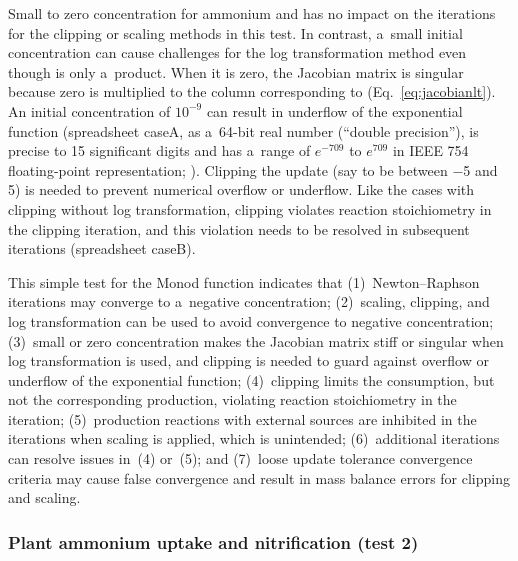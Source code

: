\documentclass[gmd,noline]{copernicus}
\begin{document}
      Small to zero concentration for ammonium and  has no
      impact on the iterations for the clipping or scaling methods in this
      test. In contrast, a~small initial  concentration can
      cause challenges for the log transformation method even though
       is only a~product. When it is zero, the Jacobian matrix
      is singular because zero is multiplied to the column corresponding to
       (Eq.~\ref{eq:jacobianlt}). An initial 
      concentration of $10^{-9}$ can result in underflow of the exponential
      function (spreadsheet caseA, as a~64-bit real number (``double
      precision''), is precise to 15 significant digits and has a~range of
      $e^{-709}$ to $e^{709}$ in IEEE 754 floating-point representation;
      \citealp{Lemmon2005}).  Clipping the update (say to be between $-$5 and
      5) is needed to prevent numerical overflow or underflow. Like the
      cases with clipping without log transformation, clipping violates
      reaction stoichiometry in the clipping iteration, and this violation
      needs to be resolved in subsequent iterations (spreadsheet caseB).

      This simple test for the Monod function indicates that
      (1)~Newton--Raphson iterations may converge to a~negative
      concentration; (2)~scaling, clipping, and log transformation can be
      used to avoid convergence to negative concentration; (3)~small or zero
      concentration makes the Jacobian matrix stiff or singular when log
      transformation is used, and clipping is needed to guard against
      overflow or underflow of the exponential function; (4)~clipping limits
      the consumption, but not the corresponding production, violating
      reaction stoichiometry in the iteration; (5)~production reactions with
      external sources are inhibited in the iterations when scaling is
      applied, which is unintended; (6)~additional iterations can resolve
      issues in~(4) or~(5); and (7)~loose update tolerance convergence
      criteria may cause false convergence and result in mass balance errors
      for clipping and scaling.



\subsubsection*{Plant ammonium uptake and nitrification (test 2)}
\end{document}

